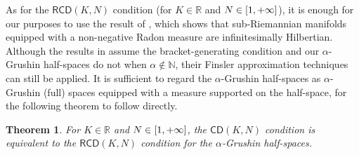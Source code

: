 \documentclass[11pt,twoside,a4paper]{article}
\newcommand*\diff{\mathop{}\!\mathrm{d}}
\newcommand{\N}{\mathbb{N}}
\newcommand{\R}{\mathbb{R}}
\newcommand{\Z}{\mathbb{Z}}
\newcommand{\g}{\mathrm{g}}
\newcommand{\cd}{\mathsf{CD}}
\newcommand{\RCD}{\mathsf{RCD}}
\newcommand{\m}{\mathfrak m} %
\theoremstyle{theorem}
\newtheorem{theorem}{Theorem}[section]
\theoremstyle{definition}
\newtheorem{definition}[theorem]{Definition}
\theoremstyle{remark}
\newtheorem{remark}[theorem]{Remark}
\theoremstyle{proof}
\begin{document}
As for the $\mathsf{RCD}(K, N)$ condition (for $K \in \R$ and $N \in \interval{1}{+\infty}$), it is enough for our purposes to use the result of \cite[Theorem 1.2]{ledonne-lucic-pasqualetto2023}, which shows that
sub-Riemannian manifolds equipped with a non-negative Radon measure are infinitesimally Hilbertian. Although the results in \cite{ledonne-lucic-pasqualetto2023} assume the bracket-generating condition and our $\alpha$-Grushin half-spaces do not when $\alpha \notin \N$, their Finsler approximation techniques can still be applied.
It is sufficient to regard the $\alpha$-Grushin half-spaces as $\alpha$-Grushin (full) spaces equipped with a measure supported on the half-space, for the following theorem to follow directly.
\begin{theorem}
     For $K \in \R$ and $N \in \interval{1}{+\infty}$, the $\cd(K,N)$ condition is equivalent to the $\RCD(K,N)$ condition for the $\alpha$-Grushin half-spaces.
\end{theorem}





\end{document}
